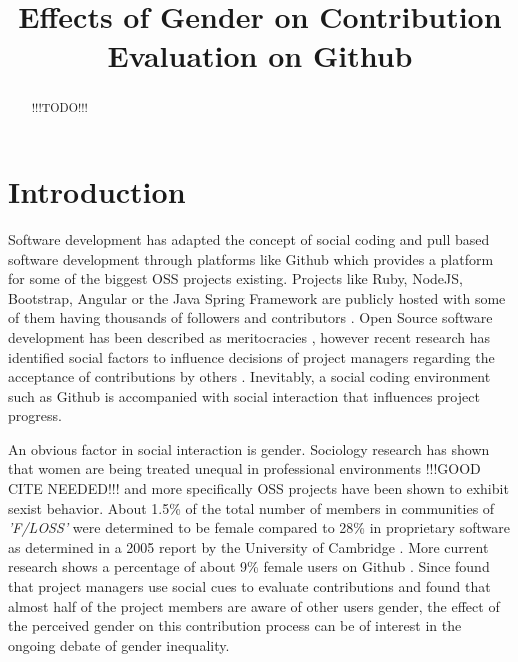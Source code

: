 


\title{Effects of Gender on Contribution Evaluation on Github}

\author{
}

\maketitle

\begin{abstract}%
!!!TODO!!! %
\end{abstract}


\section{Introduction}\label{Introduction}

Software development has adapted the concept of social coding and pull based software development through platforms like Github which provides a platform for some of the biggest \ac{OSS} projects existing. Projects like Ruby, NodeJS, Bootstrap, Angular or the Java Spring Framework are publicly hosted with some of them having thousands of followers and contributors \cite{Gousi13}. Open Source software development has been described as meritocracies \cite{Scacchi:2007:FSS:1295014.1295019}, however recent research has identified social factors to influence decisions of project managers regarding the acceptance of contributions by others \cite{Tsay:2014:IST:2568225.2568315}. Inevitably, a social coding environment such as Github is accompanied with social interaction that influences project progress.

An obvious factor in social interaction is gender. Sociology research has shown that women are being treated unequal in professional environments !!!GOOD CITE NEEDED!!! %
and more specifically \ac{OSS} projects have been shown to exhibit sexist behavior. About 1.5\% of the total number of members in communities of \emph{'\ac{F/LOSS}'} were determined to be female compared to 28\% in proprietary software as determined in a 2005 report by the University of Cambridge \cite{flosspols-gender:2005}. More current research shows a percentage of about 9\% female users on Github \cite{Vasilescu:2015:GTD:2702123.2702549}. Since
\citeauthor{Tsay:2014:IST:2568225.2568315} found that project managers use social cues to evaluate contributions and \citeauthor{Vasilescu:2015:GTD:2702123.2702549} found that almost half of the project members are aware of other users gender, the effect of the perceived gender on this contribution process can be of interest in the ongoing debate of gender inequality.

